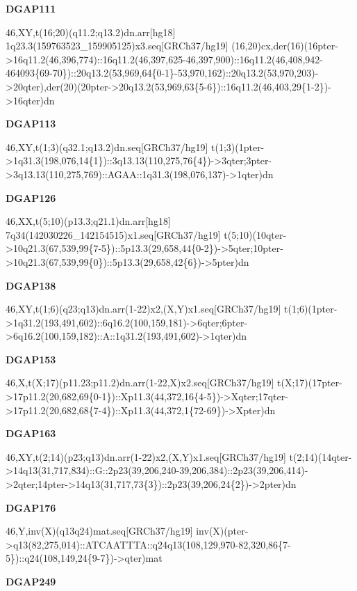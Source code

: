 \documentclass[a4paper,twoside=true,openright,parskip=full,chapterprefix=true,11pt,headings=normal,bibliography=totoc,listof=totoc,titlepage=on,captions=tableabove,draft=false]{scrreprt}
\theoremstyle{definition}
\theoremstyle{definition}
\theoremstyle{definition}
\theoremstyle{remark}
\begin{document}
\textbf{DGAP111}

46,XY,t(16;20)(q11.2;q13.2)dn.arr{[}hg18{]}
1q23.3(159763523\_159905125)x3.seq{[}GRCh37/hg19{]}
(16,20)cx,der(16)(16pter-\textgreater{}16q11.2(46,396,774)::16q11.2(46,397,625-46,397,900)::16q11.2(46,408,942-464093\{69-70\})::20q13.2(53,969,64\{0-1\}-53,970,162)::20q13.2(53,970,203)-\textgreater{}20qter),der(20)(20pter-\textgreater{}20q13.2(53,969,63\{5-6\})::16q11.2(46,403,29\{1-2\})-\textgreater{}16qter)dn

\textbf{DGAP113}

46,XY,t(1;3)(q32.1;q13.2)dn.seq{[}GRCh37/hg19{]}
t(1;3)(1pter-\textgreater{}1q31.3(198,076,14\{1\})::3q13.13(110,275,76\{4\})-\textgreater{}3qter;3pter-\textgreater{}3q13.13(110,275,769)::AGAA::1q31.3(198,076,137)-\textgreater{}1qter)dn

\textbf{DGAP126}

46,XX,t(5;10)(p13.3;q21.1)dn.arr{[}hg18{]}
7q34(142030226\_142154515)x1.seq{[}GRCh37/hg19{]}
t(5;10)(10qter-\textgreater{}10q21.3(67,539,99\{7-5\})::5p13.3(29,658,44\{0-2\})-\textgreater{}5qter;10pter-\textgreater{}10q21.3(67,539,99\{0\})::5p13.3(29,658,42\{6\})-\textgreater{}5pter)dn

\textbf{DGAP138}

46,XY,t(1;6)(q23;q13)dn.arr(1-22)x2,(X,Y)x1.seq{[}GRCh37/hg19{]}
t(1;6)(1pter-\textgreater{}1q31.2(193,491,602)::6q16.2(100,159,181)-\textgreater{}6qter;6pter-\textgreater{}6q16.2(100,159,182)::A::1q31.2(193,491,602)-\textgreater{}1qter)dn

\textbf{DGAP153}

46,X,t(X;17)(p11.23;p11.2)dn.arr(1-22,X)x2.seq{[}GRCh37/hg19{]}
t(X;17)(17pter-\textgreater{}17p11.2(20,682,69\{0-1\})::Xp11.3(44,372,16\{4-5\})-\textgreater{}Xqter;17qter-\textgreater{}17p11.2(20,682,68\{7-4\})::Xp11.3(44,372,1\{72-69\})-\textgreater{}Xpter)dn

\textbf{DGAP163}

46,XY,t(2;14)(p23;q13)dn.arr(1-22)x2,(X,Y)x1.seq{[}GRCh37/hg19{]}
t(2;14)(14qter-\textgreater{}14q13(31,717,834)::G::2p23(39,206,240-39,206,384)::2p23(39,206,414)-\textgreater{}2qter;14pter-\textgreater{}14q13(31,717,73\{3\})::2p23(39,206,24\{2\})-\textgreater{}2pter)dn

\textbf{DGAP176}

46,Y,inv(X)(q13q24)mat.seq{[}GRCh37/hg19{]}
inv(X)(pter-\textgreater{}q13(82,275,014)::ATCAATTTA::q24q13(108,129,970-82,320,86\{7-5\})::q24(108,149,24\{9-7\})-\textgreater{}qter)mat

\textbf{DGAP249}
\end{document}
